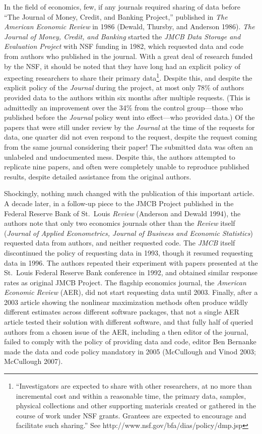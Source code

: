 \documentclass[12pt] {article}
\begin{document}
In the field of economics, few, if any journals required sharing of data
before ``The Journal of Money, Credit, and Banking Project,'' published
in \emph{The American Economic Review} in 1986 (Dewald, Thursby, and
Anderson 1986). \emph{The Journal of Money, Credit, and Banking} started
the \emph{JMCB Data Storage and Evaluation Project} with NSF funding in
1982, which requested data and code from authors who published in the
journal. With a great deal of research funded by the NSF, it should be
noted that they have long had an explicit policy of expecting
researchers to share their primary data\footnote{``Investigators are
  expected to share with other researchers, at no more than incremental
  cost and within a reasonable time, the primary data, samples, physical
  collections and other supporting materials created or gathered in the
  course of work under NSF grants. Grantees are expected to encourage
  and facilitate such sharing.'' See
  http://www.nsf.gov/bfa/dias/policy/dmp.jsp}. Despite this, and despite
the explicit policy of the \emph{Journal} during the project, at most
only 78\% of authors provided data to the authors within six months
after multiple requests. (This is admittedly an improvement over the
34\% from the control group---those who published before the
\emph{Journal} policy went into effect---who provided data.) Of the
papers that were still under review by the \emph{Journal} at the time of
the requests for data, one quarter did not even respond to the request,
despite the request coming from the same journal considering their
paper! The submitted data was often an unlabeled and undocumented mess.
Despite this, the authors attempted to replicate nine papers, and often
were completely unable to reproduce published results, despite detailed
assistance from the original authors.

Shockingly, nothing much changed with the publication of this important
article. A decade later, in a follow-up piece to the JMCB Project
published in the Federal Reserve Bank of St.~Louis \emph{Review}
(Anderson and Dewald 1994), the authors note that only two economics
journals other than the \emph{Review} itself (\emph{Journal of Applied
Econometrics, Journal of Business and Economic Statistics}) requested
data from authors, and neither requested code. The \emph{JMCB} itself
discontinued the policy of requesting data in 1993, though it resumed
requesting data in 1996. The authors repeated their experiment with
papers presented at the St.~Louis Federal Reserve Bank conference in
1992, and obtained similar response rates as original JMCB Project. The
flagship economics journal, the \emph{American Economic Review} (AER),
did not start requesting data until 2003. Finally, after a 2003 article
showing the nonlinear maximization methods often produce wildly
different estimates across different software packages, that not a
single AER article tested their solution with different software, and
that fully half of queried authors from a chosen issue of the AER,
including a then editor of the journal, failed to comply with the policy
of providing data and code, editor Ben Bernanke made the data and code
policy mandatory in 2005 (McCullough and Vinod 2003; McCullough 2007).
\end{document}
